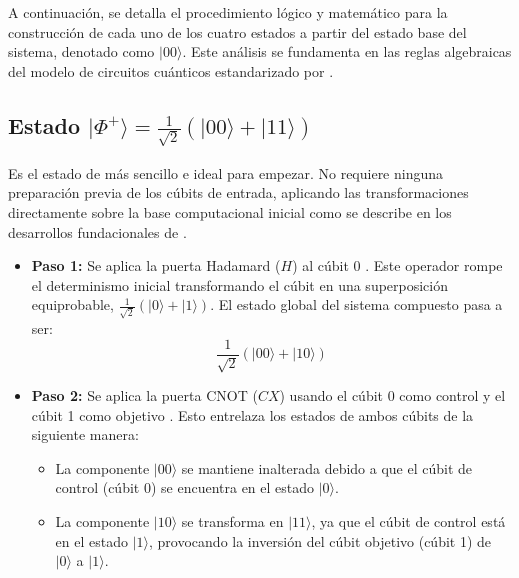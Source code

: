 \documentclass[11pt,a4paper,spanish]{book}
\begin{document}
A continuación, se detalla el procedimiento lógico y matemático para la construcción de cada uno de los cuatro estados a partir del estado base del sistema, denotado como $\lvert00\rangle$. Este análisis se fundamenta en las reglas algebraicas del modelo de circuitos cuánticos estandarizado por \cite{deutsch1989}.

\subsection{Estado $\lvert\Phi^+\rangle = \frac{1}{\sqrt{2}}(\lvert00\rangle + \lvert11\rangle)$}
Es el estado de \cite{bell1964} más sencillo e ideal para empezar. No requiere ninguna preparación previa de los cúbits de entrada, aplicando las transformaciones directamente sobre la base computacional inicial como se describe en los desarrollos fundacionales de \cite{bennett1993}.

\begin{itemize}
    \item \textbf{Paso 1:} Se aplica la puerta Hadamard ($H$) al cúbit 0 \citep{deutsch1992}. Este operador rompe el determinismo inicial transformando el cúbit en una superposición equiprobable, $\frac{1}{\sqrt{2}}(\lvert0\rangle + \lvert1\rangle)$. El estado global del sistema compuesto pasa a ser:
    $$\frac{1}{\sqrt{2}}(\lvert00\rangle + \lvert10\rangle)$$
    \item \textbf{Paso 2:} Se aplica la puerta CNOT ($CX$) usando el cúbit 0 como control y el cúbit 1 como objetivo \citep{barenco1995}. Esto entrelaza los estados de ambos cúbits de la siguiente manera:
    \begin{itemize}
        \item La componente $\lvert00\rangle$ se mantiene inalterada debido a que el cúbit de control (cúbit 0) se encuentra en el estado $\lvert0\rangle$.
        \item La componente $\lvert10\rangle$ se transforma en $\lvert11\rangle$, ya que el cúbit de control está en el estado $\lvert1\rangle$, provocando la inversión del cúbit objetivo (cúbit 1) de $\lvert0\rangle$ a $\lvert1\rangle$.
    \end{itemize}
\end{itemize}
\end{document}
